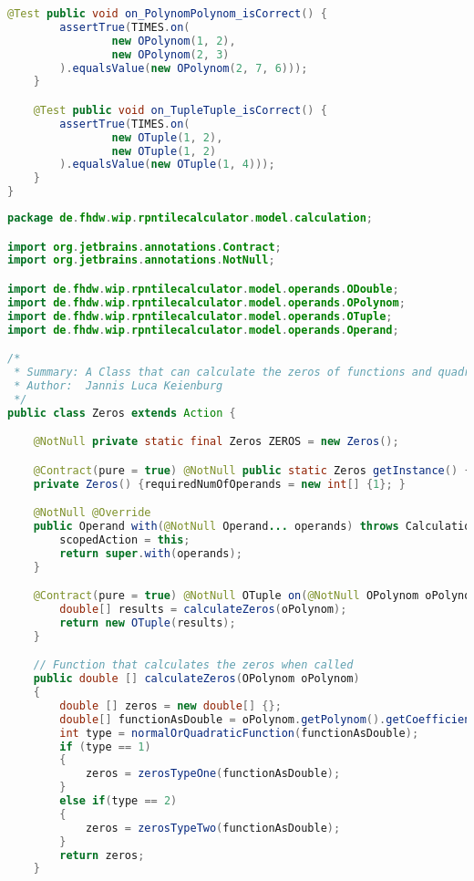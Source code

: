 \begin{lstlisting}[caption=TimesTest (Schwenke),label=list:TimesTest,language=Java]
    @Test public void on_PolynomPolynom_isCorrect() {
        assertTrue(TIMES.on(
                new OPolynom(1, 2),
                new OPolynom(2, 3)
        ).equalsValue(new OPolynom(2, 7, 6)));
    }

    @Test public void on_TupleTuple_isCorrect() {
        assertTrue(TIMES.on(
                new OTuple(1, 2),
                new OTuple(1, 2)
        ).equalsValue(new OTuple(1, 4)));
    }
}
\end{lstlisting}

\begin{lstlisting}[caption=Zeros (Keienburg),label=list:Zeros,language=Java]
package de.fhdw.wip.rpntilecalculator.model.calculation;

import org.jetbrains.annotations.Contract;
import org.jetbrains.annotations.NotNull;

import de.fhdw.wip.rpntilecalculator.model.operands.ODouble;
import de.fhdw.wip.rpntilecalculator.model.operands.OPolynom;
import de.fhdw.wip.rpntilecalculator.model.operands.OTuple;
import de.fhdw.wip.rpntilecalculator.model.operands.Operand;

/*
 * Summary: A Class that can calculate the zeros of functions and quadratic functions.
 * Author:  Jannis Luca Keienburg
 */
public class Zeros extends Action {

    @NotNull private static final Zeros ZEROS = new Zeros();

    @Contract(pure = true) @NotNull public static Zeros getInstance() { return ZEROS; }
    private Zeros() {requiredNumOfOperands = new int[] {1}; }

    @NotNull @Override
    public Operand with(@NotNull Operand... operands) throws CalculationException {
        scopedAction = this;
        return super.with(operands);
    }

    @Contract(pure = true) @NotNull OTuple on(@NotNull OPolynom oPolynom) {
        double[] results = calculateZeros(oPolynom);
        return new OTuple(results);
    }

    // Function that calculates the zeros when called
    public double [] calculateZeros(OPolynom oPolynom)
    {
        double [] zeros = new double[] {};
        double[] functionAsDouble = oPolynom.getPolynom().getCoefficients();
        int type = normalOrQuadraticFunction(functionAsDouble);
        if (type == 1)
        {
            zeros = zerosTypeOne(functionAsDouble);
        }
        else if(type == 2)
        {
            zeros = zerosTypeTwo(functionAsDouble);
        }
        return zeros;
    }


\end{lstlisting}

